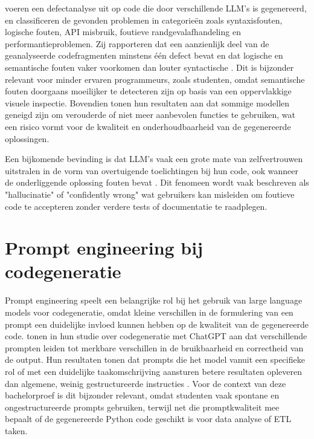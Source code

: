 \textcite{Esfahani2024} voeren een defectanalyse uit op code die door verschillende LLM's is gegenereerd, en classificeren de gevonden problemen in categorieën zoals syntaxisfouten, logische fouten, API misbruik, foutieve randgevalafhandeling en performantieproblemen. Zij rapporteren dat een aanzienlijk deel van de geanalyseerde codefragmenten minstens één defect bevat en dat logische en semantische fouten vaker voorkomen dan louter syntactische \autocite{Esfahani2024}. Dit is bijzonder relevant voor minder ervaren programmeurs, zoals studenten, omdat semantische fouten doorgaans moeilijker te detecteren zijn op basis van een oppervlakkige visuele inspectie. Bovendien tonen hun resultaten aan dat sommige modellen geneigd zijn om verouderde of niet meer aanbevolen functies te gebruiken, wat een risico vormt voor de kwaliteit en onderhoudbaarheid van de gegenereerde oplossingen.

Een bijkomende bevinding is dat LLM's vaak een grote mate van zelfvertrouwen uitstralen in de vorm van overtuigende toelichtingen bij hun code, ook wanneer de onderliggende oplossing fouten bevat \autocite{Li2023,Esfahani2024}. Dit fenomeen wordt vaak beschreven als "hallucinatie" of "confidently wrong" wat gebruikers kan misleiden om foutieve code te accepteren zonder verdere tests of documentatie te raadplegen.

\section{Prompt engineering bij codegeneratie}
\label{sec:prompt_engineering}

Prompt engineering speelt een belangrijke rol bij het gebruik van large language models voor codegeneratie, omdat kleine verschillen in de formulering van een prompt een duidelijke invloed kunnen hebben op de kwaliteit van de gegenereerde code. \textcite{Guo2024} tonen in hun studie over codegeneratie met ChatGPT aan dat verschillende prompten leiden tot merkbare verschillen in de bruikbaarheid en correctheid van de output. Hun resultaten tonen dat prompts die het model vanuit een specifieke rol of met een duidelijke taakomschrijving aansturen betere resultaten opleveren dan algemene, weinig gestructureerde instructies \autocite{Guo2024}. Voor de context van deze bachelorproef is dit bijzonder relevant, omdat studenten vaak spontane en ongestructureerde prompts gebruiken, terwijl net die promptkwaliteit mee bepaalt of de gegenereerde Python code geschikt is voor data analyse of ETL taken.

